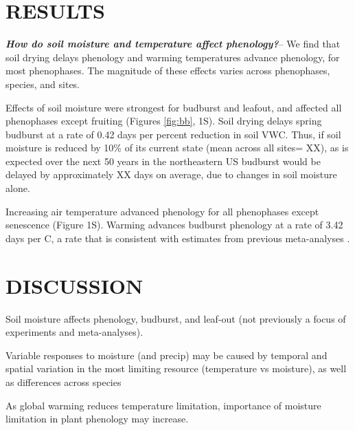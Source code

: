 \documentclass{article}
\begin{document}
\section* {RESULTS}

\textbf {\emph{How do soil moisture and temperature affect phenology?}}--
We find that soil drying delays phenology and warming temperatures advance phenology, for most phenophases. The magnitude of these effects varies across phenophases, species, and sites. 
\par Effects of soil moisture were strongest for budburst and leafout, and affected all phenophases except fruiting (Figures \ref{fig:bb}, 1S). Soil drying delays spring budburst at a rate of 0.42 days per percent reduction in soil VWC. Thus, if soil moisture is reduced by 10\% of its current state (mean across all sites= XX), as is expected over the next 50 years in the northeastern US \citep{berg2017} budburst would be delayed by approximately XX days on average, due to changes in soil moisture alone.

\par  Increasing air temperature advanced phenology for all phenophases except senescence (Figure 1S). Warming advances budburst phenology at a rate of 3.42 days per \degree C, a rate that is consistent with estimates from previous meta-analyses \citep{wolkovich2012}. 




\section* {DISCUSSION}
\par  Soil moisture affects phenology, budburst, and  leaf-out (not previously a focus of experiments and meta-analyses). 
\par Variable responses to moisture (and precip) may be caused by temporal and spatial variation in the most limiting resource (temperature vs moisture), as well as differences across species
\par As global warming reduces temperature limitation, importance of moisture limitation in plant phenology may increase. 
\end{document}
